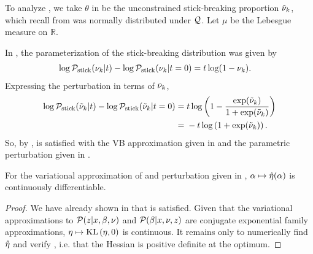 \begin{ex}
%
To analyze , we take $\theta$
in 
be the unconstrained stick-breaking proportion $\tilde{\nu}_{k}$, which
recall from 
was normally distributed under $\mathcal{Q}$.
Let $\mu$ be the Lebesgue measure on $\mathbb{R}$.

In ,
the parameterization of the stick-breaking distribution was given by
\begin{align*}
  \log \mathcal{P}_{\mathrm{stick}}(\nu_{k} \vert t) - \log \mathcal{P}_{\mathrm{stick}}(\nu_{k} \vert t=0) ={}&
  t \log(1 - \nu_{k}).
\end{align*}
%
Expressing the perturbation in terms of
$\tilde{\nu}_{k}$,
%
\begin{align*}
%
\log \pstick(\lnuk \vert \t) - \log \pstick(\lnuk \vert \t=0) ={}&
\t \log\left(1 - \frac{\exp(\lnuk)}{1 + \exp(\lnuk)}\right)
\\={}&
-\t \log\left(1 + \exp(\lnuk)\right).
%
\end{align*}
%
So, by ,  is satisfied with
the VB approximation given in  and the parametric
perturbation given in .
%
\end{ex}




\begin{cor}
%
For the variational approximation of  and perturbation
given in , $\alpha \mapsto \hat\eta(\alpha)$
is continuously differentiable.
%
\begin{proof}
%
We have already shown in  that  is
satisfied.  Given that the variational approximations to $\mathcal{P}(z \vert x, \beta,
\nu)$ and $\mathcal{P}(\beta \vert x, \nu, z)$ are conjugate exponential family
approximations, $\eta \mapsto \mathrm{KL}\left(\eta, 0\right)$ is continuous.  It remains only to
numerically find $\hat\eta$ and verify , i.e.
that the Hessian is positive definite at the optimum.
%
\end{proof}
%
\end{cor}

